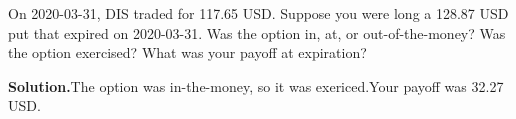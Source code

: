 \noindent On 2020-03-31, DIS traded for 117.65 USD. Suppose you were long a 128.87 USD put that expired on 2020-03-31. Was the option in, at, or out-of-the-money? Was the option exercised? What was your payoff at expiration?

\vspace{9pt} 

\textbf{Solution.}The option was in-the-money, so it was exericed.Your payoff was 32.27 USD.